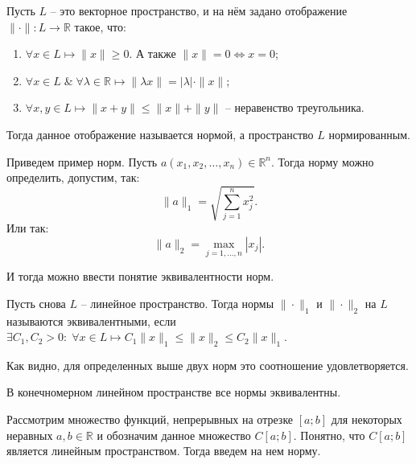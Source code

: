 \begin{definition}
    Пусть $L$ -- это векторное пространство, и на нём задано отображение $\|\cdot\|:L\longrightarrow \mathbb{R}$ такое, что:
    \begin{enumerate}
        \item $\forall x \in L \longmapsto \|x\| \geqslant 0$. А также $\|x\| = 0 \Longleftrightarrow x = 0$;
        
        \item $\forall x \in L \; \& \; \forall \lambda \in \mathbb{R} \longmapsto \|\lambda x\| = |\lambda| \cdot \|x\|$;
        
        \item $\forall x, y \in L \longmapsto \|x+y\| \leqslant \|x\| + \|y\|$ -- неравенство треугольника.
    \end{enumerate}
    Тогда данное отображение называется нормой, а пространство $L$ нормированным.
\end{definition}

\begin{example}
    Приведем пример норм. Пусть $a(x_1, x_2, \dots, x_n) \in \mathbb{R}^n$. Тогда норму можно определить, допустим, так:
    \begin{equation}
        \|a\|_1 = \sqrt{\sum_{j = 1}^{n} x_j^2}.
    \end{equation}
    Или так:
    \begin{equation}
        \|a\|_2 = \max_{j = 1, \dots, n}|x_j|.
    \end{equation}
\end{example}

И тогда можно ввести понятие эквивалентности норм.

\begin{definition}
    Пусть снова $L$ -- линейное пространство. Тогда нормы $\| \cdot \|_1$ и $\| \cdot \|_2$ на $L$ называются эквивалентными, если $\exists C_1, C_2 > 0: \; \forall x \in L \longmapsto C_1\|x\|_1 \leqslant \|x\|_2 \leqslant C_2\|x\|_1$.
\end{definition}

Как видно, для определенных выше двух норм это соотношение удовлетворяется.

\begin{proposition}
    В конечномерном линейном пространстве все нормы эквивалентны.
\end{proposition}

Рассмотрим множество функций, непрерывных на отрезке $[a; b]$ для некоторых неравных $a, b \in \mathbb{R}$ и обозначим данное множество $C[a; b]$. Понятно, что $C[a; b]$ является линейным пространством. Тогда введем на нем норму.

